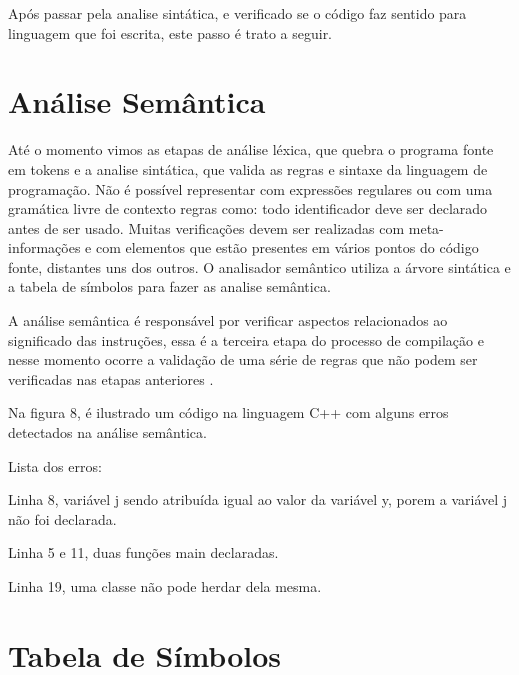 \documentclass[12pt,oneside,a4paper,chapter=TITLE,section=TITLE,sumario=tradicional]{abntex2}
\begin{document}
Após passar pela analise sintática, e verificado se o código faz sentido para linguagem que foi escrita, este passo é trato a seguir.

\section{Análise Semântica}
\label{sec:analise-semantica}

Até o momento vimos as etapas de análise léxica, que quebra o programa fonte em tokens e a analise sintática, que valida as regras e sintaxe da linguagem de programação. Não é possível representar com expressões regulares ou com uma gramática livre de contexto regras como: todo identificador deve ser declarado antes de ser usado. Muitas verificações devem ser realizadas com meta-informações e com elementos que estão presentes em vários pontos do código fonte, distantes uns dos outros. O analisador semântico utiliza a árvore sintática e a tabela de símbolos para fazer as analise semântica. 

A análise semântica é responsável por verificar aspectos relacionados ao significado das instruções, essa é a terceira etapa do processo de compilação e nesse momento ocorre a validação de uma série de regras que não podem ser verificadas nas etapas anteriores \cite{maragon2015}.

Na figura 8, é ilustrado um código na linguagem C++ com alguns erros detectados na análise semântica.

\begin{figure}[htb]
\end{figure}

Lista dos erros:

\begin{lista}
	\item Linha 8, variável j sendo atribuída igual ao valor da variável y, porem a variável j não foi declarada.
	\item Linha 5 e 11, duas funções main declaradas.
	\item Linha 19, uma classe não pode herdar dela mesma.
\end{lista}

\section{Tabela de Símbolos}
\label{sec:tabela-semantica}
\end{document}
